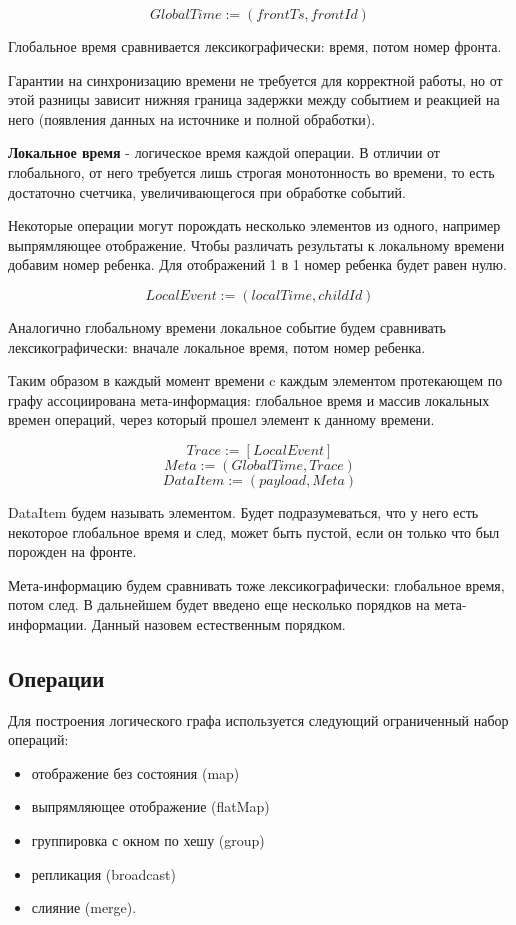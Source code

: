 \documentclass[14pt]{matmex-diploma-custom}
\begin{document}
\[GlobalTime := (frontTs, frontId)\]

Глобальное время сравнивается лексикографически: время, потом номер фронта.

Гарантии на синхронизацию времени не требуется для корректной работы, но от этой разницы зависит нижняя граница задержки между событием и реакцией на него (появления данных на источнике и полной обработки).

\textbf{Локальное время} - логическое время каждой операции. В отличии от глобального, от него требуется лишь строгая монотонность во времени, то есть достаточно счетчика, увеличивающегося при обработке событий.

Некоторые операции могут порождать несколько элементов из одного, например  выпрямляющее отображение. Чтобы различать результаты к локальному времени добавим номер ребенка. Для отображений 1 в 1 номер ребенка будет равен нулю.

\[LocalEvent := (localTime, childId)\]

Аналогично глобальному времени локальное событие будем сравнивать лексикографически: вначале локальное время, потом номер ребенка.

Таким образом в каждый момент времени c каждым элементом протекающем по графу ассоциирована мета-информация: глобальное время и массив локальных времен операций, через который прошел элемент к данному времени.

\[Trace := [LocalEvent]\]
\[Meta := (GlobalTime, Trace)\]
\[DataItem := (payload, Meta)\]

DataItem будем называть элементом. Будет подразумеваться, что у него есть некоторое глобальное время и след, может быть пустой, если он только что был порожден на фронте.

Мета-информацию будем сравнивать тоже лексикографически: глобальное время, потом след. В дальнейшем будет введено еще несколько порядков на мета-информации. Данный назовем естественным порядком.

\subsection{Операции}

Для построения логического графа используется следующий ограниченный набор операций:

\begin{itemize}
  \item отображение без состояния (map)
  \item выпрямляющее отображение (flatMap)
  \item группировка с окном по хешу (group)
  \item репликация (broadcast)
  \item слияние (merge).
\end{itemize}
\end{document}
